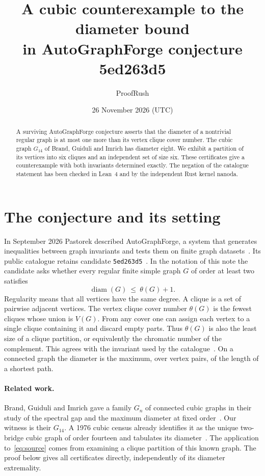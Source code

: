 \documentclass[11pt]{article}
\title{A cubic counterexample to the diameter bound\texorpdfstring{\\}{} in AutoGraphForge conjecture 5ed263d5}
\author{ProofRush}
\date{26 November 2026 (UTC)}
\newcommand{\diam}{\operatorname{diam}}
\begin{document}
\maketitle
\begin{abstract}
A surviving AutoGraphForge conjecture asserts that the diameter of a
nontrivial regular graph is at most one more than its vertex clique cover
number. The cubic graph $G_{14}$ of Brand, Guiduli and Imrich has diameter
eight. We exhibit a partition of its vertices into six cliques and an
independent set of size six. These certificates give a counterexample
with both invariants determined exactly. The negation of the catalogue
statement has been checked in Lean~4 and by the independent Rust kernel nanoda.
\end{abstract}

\section{The conjecture and its setting}
In September 2026 Pastorek described AutoGraphForge, a system that generates
inequalities between graph invariants and tests them on finite graph
datasets~\cite{pastorek}. Its public catalogue retains candidate
\texttt{5ed263d5}~\cite{catalogue}. In the notation of this note the candidate
asks whether every regular finite simple graph $G$ of order at least two satisfies
\begin{equation}
       \diam(G)\ \leq\ \theta(G)+1. \label{eq:source}
\end{equation}
Regularity means that all vertices have the same degree. A clique is a set
of pairwise adjacent vertices. The vertex clique cover number $\theta(G)$
is the fewest cliques whose union is $V(G)$. From any cover one can assign
each vertex to a single clique containing it and discard empty parts.
Thus $\theta(G)$ is also the least size of a clique partition, or equivalently
the chromatic number of the complement. This agrees with the invariant
used by the catalogue~\cite{graphcalc}. On a connected graph the diameter is
the maximum, over vertex pairs, of the length of a shortest path.

\paragraph{Related work.} Brand, Guiduli and Imrich gave a family $G_n$ of
connected cubic graphs in their study of the spectral gap and the maximum
diameter at fixed order~\cite[Definition~1 and Theorem~2]{brand}.
Our witness is their $G_{14}$. A 1976 cubic census already identifies it
as the unique two-bridge cubic graph of order fourteen and tabulates its
diameter~\cite{census}. The application to~\eqref{eq:source} comes from examining a
clique partition of this known graph. The proof below gives all certificates
directly, independently of its diameter extremality.
\end{document}
